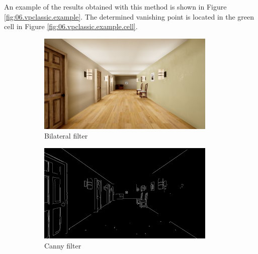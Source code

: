 An example of the results obtained with this method is shown in Figure \ref{fig:06.vpclassic.example}. The determined vanishing point is located in the green cell in Figure \ref{fig:06.vpclassic.example.cell}.

\begin{figure}[H]
    \centering
    \begin{subfigure}{0.49\textwidth}
        \centering
        \includegraphics[width=\textwidth]{resources/png/06/vanishing-point/vpclassic/0.png}
        \caption{Bilateral filter}
        \vspace{0.5em}
    \end{subfigure}
    \hfill
    \begin{subfigure}{0.49\textwidth}
        \centering
        \includegraphics[width=\textwidth]{resources/png/06/vanishing-point/vpclassic/1.png}
        \caption{Canny filter}
        \vspace{0.5em}
    \end{subfigure}
    \begin{subfigure}{0.49\textwidth}
        \centering

\end{subfigure}
\end{figure}
